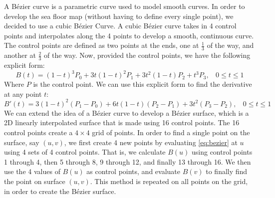 \documentclass[../main.tex]{subfiles}
\begin{document}
A B\'ezier curve is a parametric curve used to model smooth curves.  In order to develop the sea floor map (without having to define every single point), we decided to use a cubic B\'ezier Curve.  A cubic B\'ezier curve takes in 4 control points and interpolates along the 4 points to develop a smooth, continuous curve.  The control points are defined as two points at the ends, one at $\frac{1}{3}$ of the way, and another at $\frac{2}{3}$ of the way.  Now, provided the control points, we have the following explicit form:
\begin{equation} \label{eq:bezier}
B(t) = (1-t)^3P_0 + 3t(1-t)^2P_1 + 3t^2(1-t)P_2+t^3P_3, \ \ \ \ 0\leq t \leq 1
\end{equation}
Where $P$ is the control point. We can use this explicit form to find the derivative at any point $t$:
\begin{equation}\label{eq:bezierderiv}
B'(t) = 3(1-t)^2(P_1-P_0) + 6t(1-t)(P_2-P_1) + 3t^2(P_3-P_2), \ \ \ \ 0\leq t \leq 1
\end{equation}
We can extend the idea of a B\'ezier curve to develop a B\'ezier surface, which is a 2D linearly interpolated surface that is made using 16 control points. The 16 control points create a $4 \times 4$ grid of points.  In order to find a single point on the surface, say $(u, v)$, we first create 4 new points by evaluating \eqref{eq:bezier} at $u$ using 4 sets of 4 control points.  That is, we calculate $B(u)$ using control points 1 through 4, then 5 through 8, 9 through 12, and finally 13
through 16.  We then use the 4 values of $B(u)$ as control points, and evaluate $B(v)$ to finally find the point on surface $(u, v)$.  This method is repeated on all points on the grid, in order to create the B\'ezier surface. 
\end{document}
